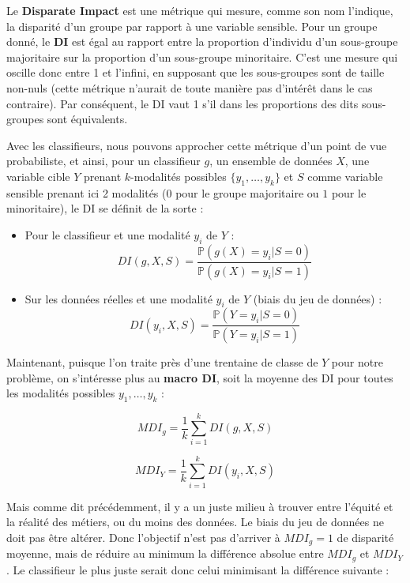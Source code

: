 Le \textbf{Disparate Impact} est une métrique qui mesure, comme son nom l’indique, la disparité d’un groupe par rapport à une variable sensible. Pour un groupe donné, le \textbf{DI} est égal au rapport entre la proportion d’individu d’un sous-groupe majoritaire sur la proportion d’un sous-groupe minoritaire. C’est une mesure qui oscille donc entre 1 et l'infini, en supposant que les sous-groupes sont de taille non-nuls (cette métrique n'aurait de toute manière pas d'intérêt dans le cas contraire). Par conséquent, le DI vaut 1 s’il dans les proportions des dits sous-groupes sont équivalents.
\newline

Avec les classifieurs, nous pouvons approcher cette métrique d’un point de vue probabiliste, et ainsi, pour un classifieur $g$, un ensemble de données $X$, une variable cible $Y$ prenant $k$-modalités possibles $\{y_1, \dots , y_k\}$ et $S$ comme variable sensible prenant ici 2 modalités ($0$ pour le groupe majoritaire ou $1$ pour le minoritaire), le DI se définit de la sorte :
\newline

\begin{itemize}
\item Pour le classifieur et une modalité $y_i$ de $Y$ :
$$DI(g, X, S) = \frac{\mathbb{P}(g(X) = y_i | S=0)}{\mathbb{P}(g(X) = y_i | S=1)}$$ 

\item Sur les données réelles et une modalité $y_i$ de $Y$ (biais du jeu de données) :
$$DI(y_i, X, S) = \frac{\mathbb{P}(Y = y_i | S=0)}{\mathbb{P}(Y = y_i | S=1)}$$
\end{itemize}

Maintenant, puisque l'on traite près d'une trentaine de classe de $Y$ pour notre problème, on s'intéresse plus au \textbf{macro DI}, soit la moyenne des DI pour toutes les modalités possibles $y_1, \dots, y_k$ :

$$
MDI_{g} = \frac{1}{k} \sum_{i=1}^{k} DI(g, X, S)
$$

$$
MDI_{Y} = \frac{1}{k} \sum_{i=1}^{k} DI(y_i, X, S)
$$

Mais comme dit précédemment, il y a un juste milieu à trouver entre l’équité et la réalité des métiers, ou du moins des données. Le biais du jeu de données ne doit pas être altérer. Donc l’objectif n’est pas d’arriver à $MDI_{g} = 1$ de disparité moyenne, mais de réduire au minimum la différence absolue entre $MDI_{g}$ et $MDI_{Y}$. Le classifieur le plus juste serait donc celui minimisant la différence suivante :

